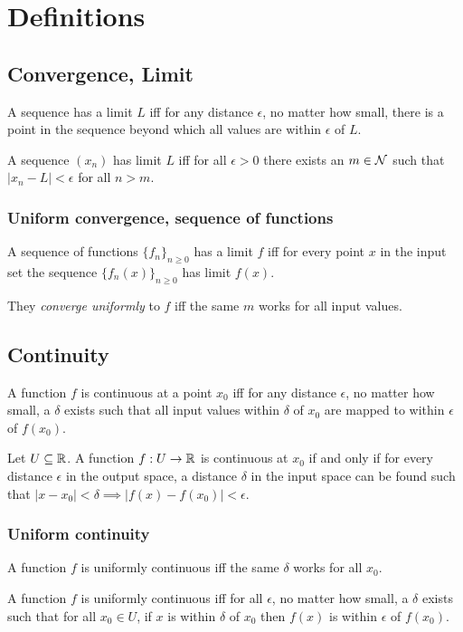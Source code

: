 \section{Definitions}
\subsection{Convergence, Limit}
A sequence has a limit $L$ iff for any distance $\epsilon$, no matter how
small, there is a point in the sequence beyond which all values are within
$\epsilon$ of $L$.

A sequence $(x_n)$ has limit $L$ iff for all $\epsilon > 0$ there exists an
$m \in \mathcal{N}$ such that $|x_n - L| < \epsilon$ for all $n > m$.

\subsubsection{Uniform convergence, sequence of functions}
A sequence of functions $\{f_n\}_{n\geq 0}$ has a limit $f$ iff for every point
$x$ in the input set the sequence $\{f_n(x)\}_{n\geq 0}$ has limit $f(x)$.

They \textit{converge uniformly} to $f$ iff the same $m$ works for all input
values.

\subsection{Continuity}
A function $f$ is continuous at a point $x_0$ iff for any distance $\epsilon$,
no matter how small, a $\delta$ exists such that all input values within
$\delta$ of $x_0$ are mapped to within $\epsilon$ of $f(x_0)$.

Let $U \subseteq \mathbb{R}$. A function $f:U \to \mathbb{R}$ is continuous at $x_0$ if and
only if for every distance $\epsilon$ in the output space, a distance $\delta$
in the input space can be found such that
$|x - x_0| < \delta \implies |f(x) - f(x_0)| < \epsilon$.

\subsubsection{Uniform continuity}
A function $f$ is uniformly continuous iff the same $\delta$ works for all $x_0$.

A function $f$ is uniformly continuous iff for all $\epsilon$, no matter how
small, a $\delta$ exists such that for all $x_0 \in U$, if $x$ is within
$\delta$ of $x_0$ then $f(x)$ is within $\epsilon$ of $f(x_0)$.

